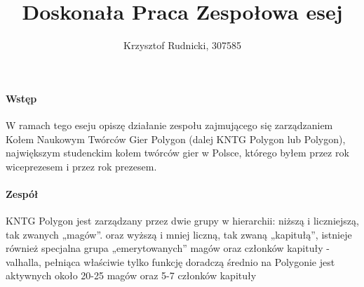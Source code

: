 \documentclass{article}[12pt]
\title{Doskonała Praca Zespołowa esej}
\author{Krzysztof Rudnicki, 307585}
\begin{document}
\maketitle
\paragraph{Wstęp}
W ramach tego eseju opiszę działanie zespołu zajmującego się zarządzaniem Kołem Naukowym Twórców Gier Polygon (dalej KNTG Polygon lub Polygon), największym studenckim kołem twórców gier w Polsce, którego byłem przez rok wiceprezesem i przez rok prezesem.
\paragraph{Zespół}
KNTG Polygon jest zarządzany przez dwie grupy w hierarchii: niższą i liczniejszą, tak zwanych „magów”. oraz wyższą i mniej liczną, tak zwaną „kapitułą”, istnieje również specjalna grupa „emerytowanych” magów oraz członków kapituły - valhalla, pełniąca właściwie tylko funkcję doradczą średnio na Polygonie jest aktywnych około 20-25 magów oraz 5-7 członków kapituły
\end{document}
